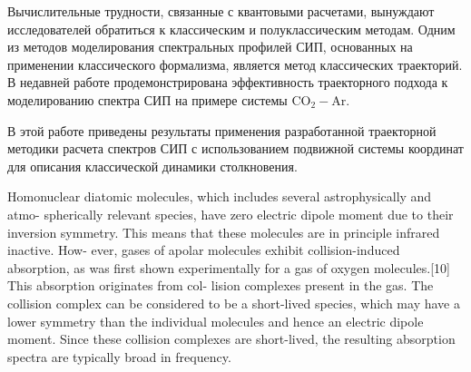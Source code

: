 Вычислительные трудности, связанные с квантовыми расчетами, вынуждают исследователей обратиться к классическим и полуклассическим методам. Одним из методов моделирования спектральных профилей СИП, основанных на применении классического формализма, является метод классических траекторий. В недавней работе \cite{oparin2017} продемонстрирована эффективность траекторного подхода к моделированию спектра СИП на примере системы CO$_2-$Ar. \par
В этой работе приведены результаты применения разработанной траекторной методики расчета спектров СИП с использованием подвижной системы координат для описания классической динамики столкновения. 

\iffalse
Homonuclear diatomic molecules, which includes several astrophysically and atmo-
spherically relevant species, have zero electric dipole moment due to their inversion
symmetry. This means that these molecules are in principle infrared inactive. How-
ever, gases of apolar molecules exhibit collision-induced absorption, as was first shown
experimentally for a gas of oxygen molecules.[10] This absorption originates from col-
lision complexes present in the gas. The collision complex can be considered to be a
short-lived species, which may have a lower symmetry than the individual molecules
and hence an electric dipole moment. Since these collision complexes are short-lived,
the resulting absorption spectra are typically broad in frequency.

